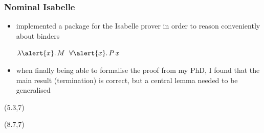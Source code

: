 \documentclass[dvipsnames,14pt,t]{beamer}
\newcommand{\bl}[1]{\textcolor{blue}{#1}}
\begin{document}
\begin{frame}[t]
\frametitle{\Large Nominal Isabelle}

\begin{itemize}
\item implemented a package for the Isabelle prover 
in order to reason conveniently about binders 
 
\begin{center}
\large\bl{$\lambda \alert{x}.\,M$} \hspace{10mm}
\bl{$\forall \alert{x}.\,P\,x$}
\end{center}\bigskip\bigskip\bigskip\bigskip
\bigskip\bigskip\bigskip\pause\pause
  
  
\item when finally being able to formalise the proof from my PhD, I found that the main result
      (termination) is correct, but a central lemma needed to
      be generalised
\end{itemize}


\begin{textblock}{3}(5.3,7)
\end{textblock}

\begin{textblock}{3}(8.7,7)
\end{textblock}

\end{frame}
\end{document}
